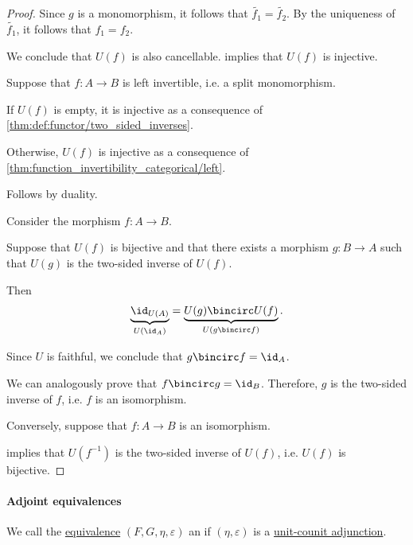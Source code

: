 \begin{proof}
  Since \( g \) is a monomorphism, it follows that \( \widetilde{f_1} = \widetilde{f_2} \). By the uniqueness of \( \widetilde{f_1} \), it follows that \( f_1 = f_2 \).

  We conclude that \( U(f) \) is also cancellable.  implies that \( U(f) \) is injective.

   Suppose that \( f: A \to B \) is left invertible, i.e. a split monomorphism.

  If \( U(f) \) is empty, it is injective as a consequence of \cref{thm:def:functor/two_sided_inverses}.

  Otherwise, \( U(f) \) is injective as a consequence of \cref{thm:function_invertibility_categorical/left}.

   Follows by duality.

   Consider the morphism \( f: A \to B \).

  \SufficiencySubProof* Suppose that \( U(f) \) is bijective and that there exists a morphism \( g: B \to A \) such that \( U(g) \) is the two-sided inverse of \( U(f) \).

  Then
  \begin{equation*}
    \underbrace{\id_{U(A)}}_{U(\id_A)} = \underbrace{U(g) \bincirc U(f)}_{U(g \bincirc f)}.
  \end{equation*}

  Since \( U \) is faithful, we conclude that \( g \bincirc f = \id_A \).

  We can analogously prove that \( f \bincirc g = \id_B \). Therefore, \( g \) is the two-sided inverse of \( f \), i.e. \( f \) is an isomorphism.

  \NecessitySubProof* Conversely, suppose that \( f: A \to B \) is an isomorphism.

   implies that \( U(f^{-1}) \) is the two-sided inverse of \( U(f) \), i.e. \( U(f) \) is bijective.
\end{proof}

\paragraph{Adjoint equivalences}

\begin{definition}\label{def:adjoint_equivalence}
  We call the \hyperref[def:equivalence_of_categories]{equivalence} \( (F, G, \eta, \varepsilon) \) an  if \( (\eta, \varepsilon) \) is a \hyperref[def:unit_counit_adjunction]{unit-counit adjunction}.
\end{definition}

